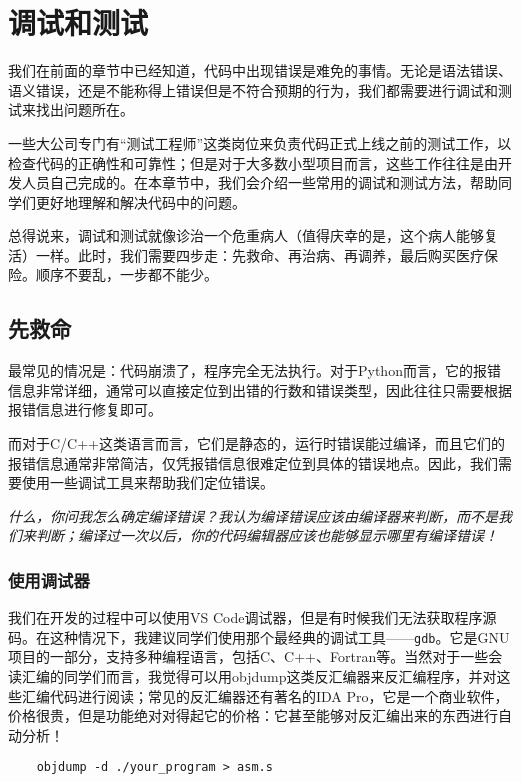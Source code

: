 \documentclass[../main.tex]{subfiles}
\begin{document}
\chapter{调试和测试}

我们在前面的章节中已经知道，代码中出现错误是难免的事情。无论是语法错误、语义错误，还是不能称得上错误但是不符合预期的行为，我们都需要进行调试和测试来找出问题所在。

一些大公司专门有“测试工程师”这类岗位来负责代码正式上线之前的测试工作，以检查代码的正确性和可靠性；但是对于大多数小型项目而言，这些工作往往是由开发人员自己完成的。在本章节中，我们会介绍一些常用的调试和测试方法，帮助同学们更好地理解和解决代码中的问题。

总得说来，调试和测试就像诊治一个危重病人（值得庆幸的是，这个病人能够复活）一样。此时，我们需要四步走：先救命、再治病、再调养，最后购买医疗保险。顺序不要乱，一步都不能少。

\section{先救命}

最常见的情况是：代码崩溃了，程序完全无法执行。对于Python而言，它的报错信息非常详细，通常可以直接定位到出错的行数和错误类型，因此往往只需要根据报错信息进行修复即可。

而对于C/C++这类语言而言，它们是静态的，运行时错误能过编译，而且它们的报错信息通常非常简洁，仅凭报错信息很难定位到具体的错误地点。因此，我们需要使用一些调试工具来帮助我们定位错误。

\emph{什么，你问我怎么确定编译错误？我认为编译错误应该由编译器来判断，而不是我们来判断；编译过一次以后，你的代码编辑器应该也能够显示哪里有编译错误！}

\subsection{使用调试器}

我们在开发的过程中可以使用VS Code调试器，但是有时候我们无法获取程序源码。在这种情况下，我建议同学们使用那个最经典的调试工具——\texttt{gdb}。它是GNU项目的一部分，支持多种编程语言，包括C、C++、Fortran等。当然对于一些会读汇编的同学们而言，我觉得可以用objdump这类反汇编器来反汇编程序，并对这些汇编代码进行阅读；常见的反汇编器还有著名的IDA Pro，它是一个商业软件，价格很贵，但是功能绝对对得起它的价格：它甚至能够对反汇编出来的东西进行自动分析！
\begin{verbatim}
    objdump -d ./your_program > asm.s
\end{verbatim}
\end{document}
